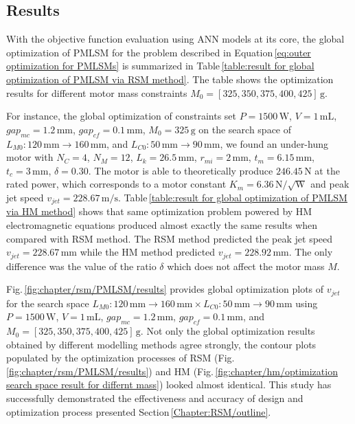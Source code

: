         \subsection{Results}                   \label{Chapter:RSM/PMLSM/Results}


            With the objective function evaluation using \acs{ANN} models at its core, the global optimization of \acs{PMLSM} for the problem described in Equation\,\ref{eq:outer optimization for PMLSMs} is summarized in Table\,\ref{table:result for global optimization of PMLSM via RSM method}. The table shows the optimization results for different motor mass constraints $M_0=[325,350,375,400,425]\,\mathrm{g}$.
            
            
            For instance, the global optimization of constraints set $P=1500\,\mathrm{W}$, $V=1\,\mathrm{mL}$, $gap_{mc}=1.2\,\mathrm{mm}$, $gap_{cf}=0.1\,\mathrm{mm}$, $M_0=325\,\mathrm{g}$ on the search space of $L_{M0}:120\,\mathrm{mm}\rightarrow 160\,\mathrm{mm}$, and $L_{C0}:50\,\mathrm{mm}\rightarrow 90\,\mathrm{mm}$, we found an under-hung motor with $N_C=4$, $N_M=12$, $L_k=26.5\,\mathrm{mm}$, $r_{mi}=2\,\mathrm{mm}$, $t_m=6.15\,\mathrm{mm}$, $t_c=3\,\mathrm{mm}$, $\delta=0.30$. The motor is able to theoretically produce $246.45\,\mathrm{N}$ at the rated power, which corresponds to a motor constant $K_m=6.36\,\mathrm{N/\sqrt{W}}$ and peak jet speed $v_{jet}=228.67\,\mathrm{m/s}$. Table\,\ref{table:result for global optimization of PMLSM via HM method} shows that same optimization problem powered by \acs{HM} electromagnetic equations produced almost exactly the same results when compared with \acs{RSM} method. The \acs{RSM} method predicted the peak jet speed $v_{jet}=228.67\,\mathrm{mm}$ while the \acs{HM} method predicted $v_{jet}=228.92\,\mathrm{mm}$. The only difference was the value of the ratio $\delta$ which does not affect the motor mass $M$.  
            
            
            Fig.\,\ref{fig:chapter/rsm/PMLSM/results} provides global optimization plots of $v_{jet}$ for the search space $L_{M0}:120\,\mathrm{mm}\rightarrow 160\,\mathrm{mm} \times L_{C0}:50\,\mathrm{mm}\rightarrow 90\,\mathrm{mm}$ using $P=1500\,\mathrm{W}$, $V=1\,\mathrm{mL}$, $gap_{mc}=1.2\,\mathrm{mm}$, $gap_{cf}=0.1\,\mathrm{mm}$,  and $M_0=[325,350,375,400,425]\,\mathrm{g}$. Not only the global optimization results obtained by different modelling methods agree strongly, the contour plots populated by the optimization processes of \acs{RSM} (Fig.\,\ref{fig:chapter/rsm/PMLSM/results}) and \acs{HM} (Fig.\,\ref{fig:chapter/hm/optimization search space result for differnt mass}) looked almost identical. This study has successfully demonstrated the effectiveness and accuracy of design and optimization process presented Section\,\ref{Chapter:RSM/outline}.
        

